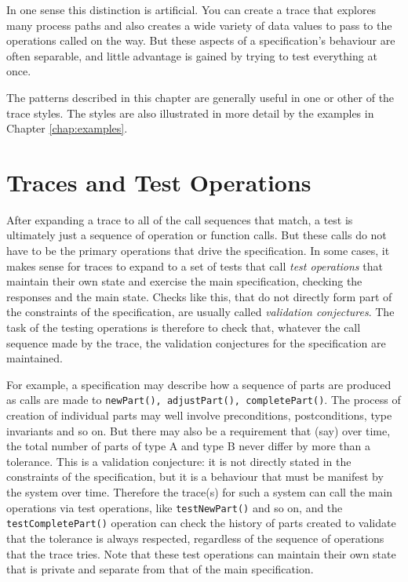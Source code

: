 \documentclass{overturerepchap}
\begin{document}
In one sense this distinction is artificial. You can create a trace that
explores many process paths and also creates a wide variety of data values to
pass to the operations called on the way. But these aspects of a specification's
behaviour are often separable, and little advantage is gained by trying to test
everything at once. 

The patterns described in this chapter are generally useful in one or other of
the trace styles. The styles are also illustrated in more detail by the
examples in Chapter \ref{chap:examples}.

\section{Traces and Test Operations}

After expanding a trace to all of the call sequences that match, a
test is ultimately just a sequence of operation or function calls. But these
calls do not have to be the primary operations that drive the specification. In
some cases, it makes sense for traces to expand to a set of tests that call
\emph{test operations} that maintain their own state and exercise the main
specification, checking the responses and the main state. Checks like this, that
do not directly form part of the constraints of the specification, are usually
called \emph{validation conjectures}. The task of the testing operations is
therefore to check that, whatever the call sequence made by the trace, the
validation conjectures for the specification are maintained.

For example, a specification may describe how a sequence of parts are produced
as calls are made to \texttt{newPart(), adjustPart(), completePart()}. The
process of creation of individual parts may well involve preconditions,
postconditions, type invariants and so on. But there may also be a requirement
that (say) over time, the total number of parts of type A and type B never
differ by more than a tolerance. This is a validation conjecture: it is not
directly stated in the constraints of the specification, but it is a behaviour
that must be manifest by the system over time. Therefore the trace(s) for such
a system can call the main operations via test operations, like
\texttt{testNewPart()} and so on, and the \texttt{testCompletePart()} operation
can check the history of parts created to validate that the tolerance is always
respected, regardless of the sequence of operations that the trace tries. Note
that these test operations can maintain their own state that is private and
separate from that of the main specification.
\end{document}
